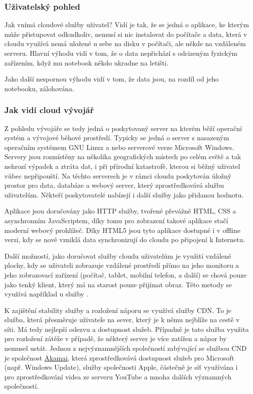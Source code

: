 \subsubsection{Uživatelský pohled}
Jak vnímá cloudové služby uživatel? Vidí je tak, že se jedná o aplikace, ke kterým může přistupovat odkudkoliv, nemusí si nic instalovat do počítače a data, která v cloudu využívá nemá uložené u sebe na disku v počítači, ale někde na vzdáleném serveru. Hlavní výhodu vidí v tom, že o data nepřichází s odcizeným fyzickým zařízením, když mu notebook někdo ukradne na letišti.

Jako další nespornou výhodu vidí v tom, že data jsou, na rozdíl od jeho notebooku, zálohována.

\subsubsection{Jak vidí cloud vývojář}
Z pohledu vývojáře se tedy jedná o poskytovaný server na kterém běží operační systém a vývojové běhové prostředí. Typicky se jedná o server s nasazeným operačním systémem GNU Linux a nebo serverové verze Microsoft Windows. Servery jsou rozmístěny na několika geografických místech po celém světě a tak nehrozí výpadek a ztráta dat, i při přírodní katastrofě, kterou si běžný uživatel vůbec nepřipouští. Na těchto serverech je v rámci cloudu poskytován úložný prostor pro data, databáze a webový server, který zprostředkovává službu uživatelům. Někteří poskytovatelé nabízejí i další služby jako přidanou hodnotu.

Aplikace jsou doručovány jako HTTP služby, tvořené převážně HTML, CSS a asynchronním JavaScriptem, díky tomu pro zobrazení takové aplikace stačí moderní webový prohlížeč. Díky HTML5 jsou tyto aplikace dostupné i v offline verzi, kdy se nově vzniklá data synchronizují do cloudu po připojení k Internetu.

Další možností, jako doručovat služby cloudu uživatelům je využití vzdálené plochy, kdy se uživateli zobrazuje vzdálené prostředí přímo na jeho monitoru a jeho zobrazovací zařízení (počítač, tablet, mobilní telefon, a další) se chová pouze jako tenký klient, který má na starost pouze přijímat obraz. Této metody se využívá například u služby .

K zajištění stability služby a rozložení náporu se využívá služby CDN. To je služba, která přesměruje uživatele na sever, který je k němu nejblíže na cestě v síti. Má tedy nejlepší odezvu a dostupnost služeb. Případně je tato služba využita pro rozložení zátěže v případě, že některý server je více zatížen a nápor by nemusel ustát. Jednou z nejvýznamnějších společností zabývající se službou CND je společnost \href{http://www.akamai.com/}{Akamai}, která zprostředkovává dostupnost služeb pro Microsoft (např. Windows Update), služby společnosti Apple, částečně je síť využívána i pro zprostředkování videa ze serveru YouTube a mnoha dalších významných společností.

